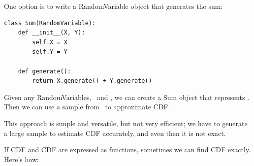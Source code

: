\documentclass[12pt]{book}
\begin{document}
One option is to write a RandomVariable object that generates
the sum:
%
\begin{verbatim}
class Sum(RandomVariable):
    def __init__(X, Y):
        self.X = X
        self.Y = Y

    def generate():
        return X.generate() + Y.generate()
\end{verbatim}

Given any RandomVariables, \X~and \Y, we can create a Sum
object that represents \Z.  Then we can use a sample from \Z~to
approximate CDF.

This approach is simple and versatile, but not very efficient; we
have to generate a large sample to estimate CDF accurately, and
even then it is not exact.

If CDF and CDF are expressed as functions, sometimes we can
find CDF exactly.  Here's how:

\newcommand{\infint}{\int_{-\infty}^{\infty}}
\newcommand{\spa}{~}
\newcommand{\given}{~|~}
\end{document}
